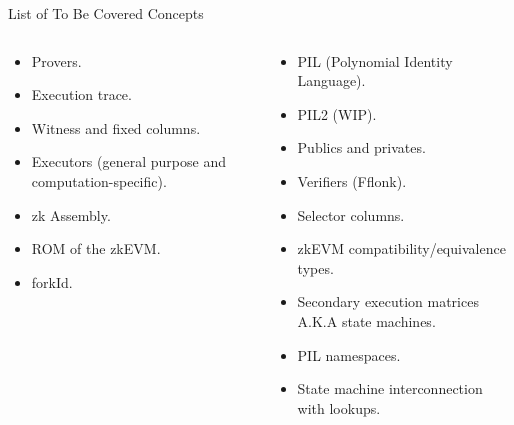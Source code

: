 \ifARCHMAP
\begin{frame}{List of To Be Covered Concepts}
\begin{columns}
\begin{column}{0.48\textwidth}
\begin{itemize}
\item Provers. \hfill \CheckedBox
\item Execution trace. \hfill \CheckedBox
\item Witness and fixed columns. \hfill \CheckedBox
\item Executors (general purpose and computation-specific). \hfill \CheckedBox
\item zk Assembly. \hfill \CheckedBox
\item ROM of the zkEVM. \hfill \CheckedBox
\item forkId. \hfill \CheckedBox
\end{itemize}
\end{column}
\begin{column}{0.48\textwidth}
\begin{itemize}
\item PIL (Polynomial Identity Language). \hfill \Square
\item PIL2 (WIP). \hfill \Square
\item Publics and privates. \hfill \Square
\item Verifiers (Fflonk). \hfill \Square
\item Selector columns. \hfill \Square
\item zkEVM compatibility/equivalence types. \hfill \Square
\item Secondary execution matrices A.K.A state machines. \hfill \Square
\item PIL namespaces. \hfill \Square
\item State machine interconnection with lookups. \hfill \Square
\end{itemize}
\end{column}
\end{columns}
\end{frame}
\fi



